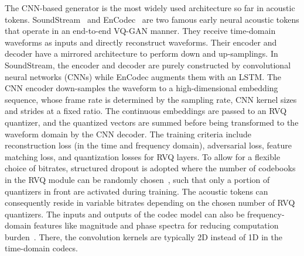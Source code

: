 The CNN-based generator is the most widely used architecture so far in acoustic tokens.
SoundStream~\cite{zeghidour2021soundstream} and EnCodec~\cite{encodec} are two famous early neural acoustic tokens that operate in an end-to-end VQ-GAN manner.
They receive time-domain waveforms as inputs and directly reconstruct waveforms.
Their encoder and decoder have a mirrored architecture to perform down and up-samplings.
In SoundStream, the encoder and decoder are purely constructed by convolutional neural networks (CNNs) while EnCodec augments them with an LSTM.
The CNN encoder down-samples the waveform to a high-dimensional embedding sequence, whose frame rate is determined by the sampling rate, CNN kernel sizes and strides at a fixed ratio.
The continuous embeddings are passed to an RVQ quantizer, and the quantized vectors are summed before being transformed to the waveform domain by the CNN decoder.
The training criteria include reconstruction loss (in the time and frequency domain), adversarial loss, feature matching loss, and quantization losses for RVQ layers.
To allow for a flexible choice of bitrates, structured dropout is adopted where the number of codebooks in the RVQ module can be randomly chosen~\cite{zeghidour2021soundstream}, such that only a portion of quantizers in front are activated during training.
The acoustic tokens can consequently reside in variable bitrates depending on the chosen number of RVQ quantizers.
The inputs and outputs of the codec model can also be frequency-domain features like magnitude and phase spectra for reducing computation burden~\cite{du2024funcodec}.
There, the convolution kernels are typically 2D instead of 1D in the time-domain codecs.

